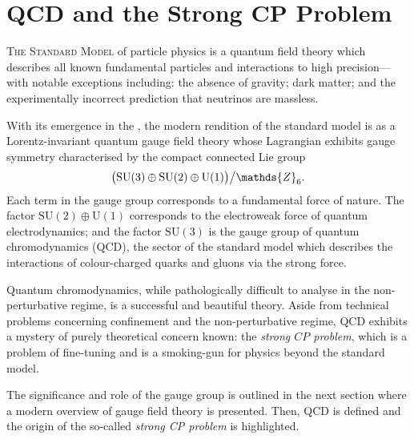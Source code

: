 \chapter{QCD and the Strong CP Problem}

\textsc{The Standard Model} of particle physics is a quantum field theory which describes all known fundamental particles and interactions to high precision---with notable exceptions including:
the absence of gravity;
dark matter;
and the experimentally incorrect prediction that neutrinos are massless.

With its emergence in the , the modern rendition of the standard model is as a Lorentz-invariant quantum gauge field theory whose Lagrangian exhibits gauge symmetry characterised by the compact connected Lie group
\begin{align}
	\qty\big(\mathrm{SU}(3)\oplus\mathrm{SU}(2)\oplus\mathrm{U}(1))\big/\mathds{Z}_6
	\label{eqn:SM-gauge-group}
.\end{align}
Each term in the gauge group corresponds to a fundamental force of nature.
The factor $\mathrm{SU}(2)\oplus\mathrm{U}(1)$ corresponds to the electroweak force of quantum electrodynamics; and the factor $\mathrm{SU}(3)$ is the gauge group of quantum chromodynamics (QCD), the sector of the standard model which describes the interactions of colour-charged quarks and gluons via the strong force.

Quantum chromodynamics, while pathologically difficult to analyse in the non-perturbative regime, is a successful and beautiful theory.
Aside from technical problems concerning confinement and the non-perturbative regime, QCD exhibits a mystery of purely theoretical concern known: the \emph{strong $CP$ problem}, which is a problem of fine-tuning and is a smoking-gun for physics beyond the standard model.



The significance and role of the gauge group is outlined in the next section where a modern overview of gauge field theory
is presented.
Then, QCD is defined and the origin of the so-called \emph{strong CP problem} is highlighted.



